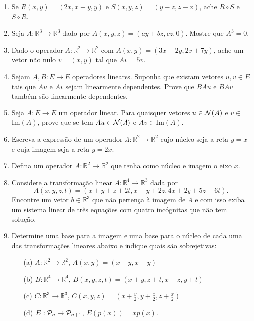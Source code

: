 \documentclass[12pt]{article}
\begin{document}
\begin{enumerate}
\item Se $R(x,y) = (2x,x-y,y)$ e $S(x,y,z) = (y-z,z-x)$, ache $R\circ S$ e $S\circ R$.

\item Seja $A:{\mathbb{R}}^3 \rightarrow {\mathbb{R}}^3$ dado por $A(x,y,z) = (ay+bz,cz,0)$. Mostre que $A^3=0$.

\item Dado o operador $A:{\mathbb{R}}^2\rightarrow {\mathbb{R}}^2$ com $A(x,y)=(3x-2y,2x+7y)$, ache um vetor não nulo $v=(x,y)$ tal que $Av=5v$.

\item Sejam $A,B:E\rightarrow E$ operadores lineares. Suponha que existam vetores $u,v\in E$ tais que $Au$ e $Av$ sejam linearmente dependentes. Prove que $BAu$ e $BAv$ também são linearmente dependentes.

\item Seja $A:E\rightarrow E$ um operador linear. Para quaisquer vetores $u\in {\cal{N}}(A)$ e $v\in $Im$(A)$, prove que se tem $Au \in {\cal{N}}(A)$ e $Av \in $Im$(A)$.

\item Escreva a expressão de um operador $A:{\mathbb{R}}^2 \rightarrow {\mathbb{R}}^2$ cujo núcleo seja a reta $y=x$ e cuja imagem seja a reta $y=2x$.

\item Defina um operador $A:{\mathbb{R}}^2 \rightarrow {\mathbb{R}}^2$ que tenha como núcleo e imagem o eixo $x$.

\item Considere a transformação linear $A:{\mathbb{R}}^4\rightarrow {\mathbb{R}}^3$ dada por
  $$A(x,y,z,t) = (x+y+z+2t,x-y+2z,4x+2y+5z+6t).$$
  Encontre um vetor $b\in {\mathbb{R}}^3$ que não pertença à imagem de $A$ e com isso exiba um sistema linear de três equações com quatro incógnitas que não tem solução.

\item Determine uma base para a imagem e uma base para o núcleo de cada uma das transformações lineares abaixo e indique quais são sobrejetivas:
  \begin{itemize}
  \item[(a)] $A:{\mathbb{R}}^2 \rightarrow {\mathbb{R}}^2$, $A(x,y) = (x-y,x-y)$
  \item[(b)] $B:{\mathbb{R}}^4\rightarrow {\mathbb{R}}^4$, $B(x,y,z,t) = (x+y,z+t,x+z,y+t)$
  \item[(c)] $C:{\mathbb{R}}^3 \rightarrow {\mathbb{R}}^3$, $C(x,y,z) = (x+\frac{y}{2},y+\frac{z}{2},z+\frac{x}{2})$
  \item[(d)] $E:{\cal{P}}_n \rightarrow {\cal{P}}_{n+1}$, $E(p(x)) = xp(x)$.
  \end{itemize}


\end{enumerate}
\end{document}
